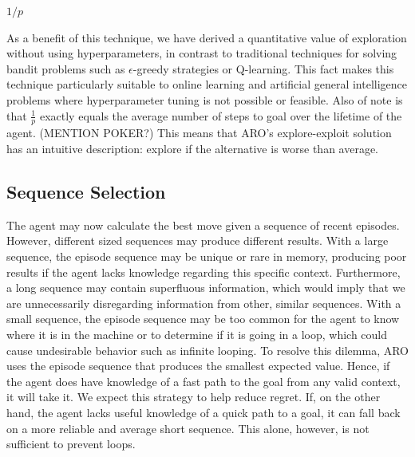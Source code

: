 \documentclass[letterpaper]{article} %
\begin{document}
\begin{algorithmic}[-1]
	
		\State \Return $1/p$
	\EndFunction
	
\end{algorithmic}

As a benefit of this technique, we have derived a quantitative value of exploration without using hyperparameters, in contrast to traditional techniques for solving bandit problems such as $\epsilon$-greedy strategies or Q-learning. This fact makes this technique particularly suitable to online learning and artificial general intelligence problems where hyperparameter tuning is not possible or feasible. Also of note is that $\frac{1}{p}$ exactly equals the average number of steps to goal over the lifetime of the agent. (MENTION POKER?) This means that ARO's explore-exploit solution has an intuitive description: explore if the alternative is worse than average.

\subsection{Sequence Selection}

The agent may now calculate the best move given a sequence of recent episodes. However, different sized sequences may produce different results. With a large sequence, the episode sequence may be unique or rare in memory, producing poor results if the agent lacks knowledge regarding this specific context. Furthermore, a long sequence may contain superfluous information, which would imply that we are unnecessarily disregarding information from other, similar sequences. With a small sequence, the episode sequence may be too common for the agent to know where it is in the machine or to determine if it is going in a loop, which could cause undesirable behavior such as infinite looping. To resolve this dilemma, ARO uses the episode sequence that produces the smallest expected value. Hence, if the agent does have knowledge of a fast path to the goal from any valid context, it will take it. We expect this strategy to help reduce regret. If, on the other hand, the agent lacks useful knowledge of a quick path to a goal, it can fall back on a more reliable and average short sequence. This alone, however, is not sufficient to prevent loops.
\end{document}
